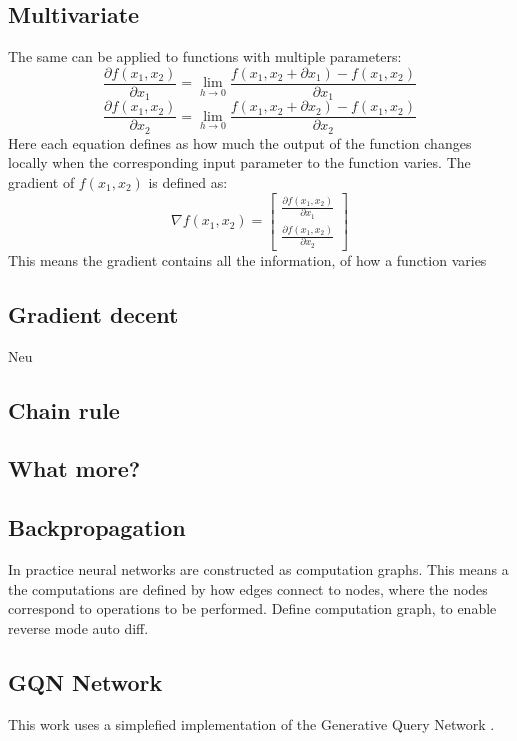 \documentclass[a4paper, twoside, 10pt]{report}
\begin{document}
\subsection{Multivariate}
The same can be applied to functions with multiple parameters:
\begin{equation}
\frac{\partial f(x_1, x_2)}{\partial x_1} = \lim_{h\to 0}\frac{f(x_1, x_2 + \partial x_1) - f(x_1, x_2)}{\partial x_1}
\end{equation}
\begin{equation}
\frac{\partial f(x_1, x_2)}{\partial x_2} = \lim_{h\to 0}\frac{f(x_1, x_2 + \partial x_2) - f(x_1, x_2)}{\partial x_2}
\end{equation}
Here each equation defines as how much the output of the function changes locally when the corresponding input parameter to the function varies.
The gradient of $f(x_1, x_2)$ is defined as:
\begin{equation}
\nabla f(x_1, x_2) = 
	\begin{bmatrix}
	\frac{\partial f(x_1, x_2)}{\partial x_1} \\[2mm]
	\frac{\partial f(x_1, x_2)}{\partial x_2}
	\end{bmatrix}
\end{equation}
This means the gradient contains all the information, of how a function varies

\subsection{Gradient decent}
Neu

\subsection{Chain rule}
\subsection{What more?}


\subsection{Backpropagation}
In practice neural networks are constructed as computation graphs. This means a the computations are defined by how edges connect to nodes, where the nodes correspond to operations to be performed.
Define computation graph, to enable reverse mode auto diff.

\subsection{GQN Network}
This work uses a simplefied implementation of the Generative Query Network \cite{gqn}.
\end{document}
